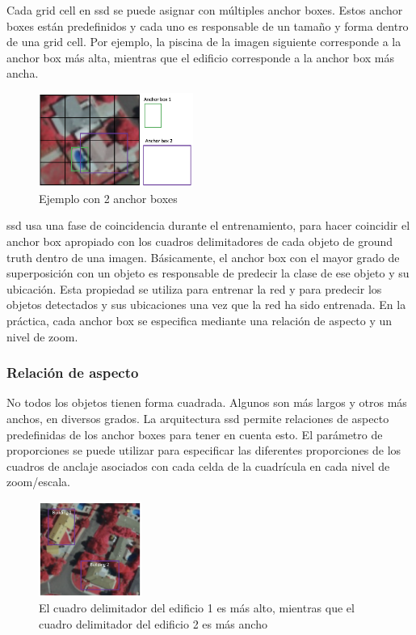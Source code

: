 Cada grid cell en \gls{ssd} se puede asignar con múltiples anchor boxes. Estos anchor boxes están predefinidos y cada uno es responsable de un tamaño y forma dentro de una grid cell. Por ejemplo, la piscina de la imagen siguiente corresponde a la anchor box más alta, mientras que el edificio corresponde a la anchor box más ancha.

\begin{figure}[ht]
\centering
\includegraphics[width=0.45\textwidth]{img/chapters/estado-del-arte/ejemplo-2-anchor-boxes.png}
\caption{\label{fig:ejemplo-2-anchor-boxes}Ejemplo con 2 anchor boxes}
\end{figure}

\gls{ssd} usa una fase de coincidencia durante el entrenamiento, para hacer coincidir el anchor box apropiado con los cuadros delimitadores de cada objeto de ground truth dentro de una imagen. Básicamente, el anchor box con el mayor grado de superposición con un objeto es responsable de predecir la clase de ese objeto y su ubicación. Esta propiedad se utiliza para entrenar la red y para predecir los objetos detectados y sus ubicaciones una vez que la red ha sido entrenada. En la práctica, cada anchor box se especifica mediante una relación de aspecto y un nivel de zoom.

\subsubsection*{Relación de aspecto}
\label{subsubsec:aspect-ratio-ssd}

No todos los objetos tienen forma cuadrada. Algunos son más largos y otros más anchos, en diversos grados. La arquitectura \gls{ssd} permite relaciones de aspecto predefinidas de los anchor boxes para tener en cuenta esto. El parámetro de proporciones se puede utilizar para especificar las diferentes proporciones de los cuadros de anclaje asociados con cada celda de la cuadrícula en cada nivel de zoom/escala.

\begin{figure}[ht]
\centering
\includegraphics[width=0.30\textwidth]{img/chapters/estado-del-arte/aspect_ratio-ejemplo-ssd.png}
\caption{\label{fig:aspect_ratio-ejemplo-ssd}El cuadro delimitador del edificio 1 es más alto, mientras que el cuadro delimitador del edificio 2 es más ancho}
\end{figure}


